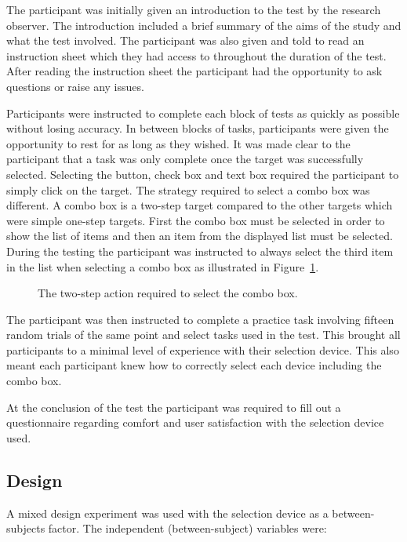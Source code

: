 \documentclass{elsart}
\begin{document}
The participant was initially given an introduction to the test by the
research observer. The introduction included a brief summary of the aims
of the study and what the test involved. The participant was also given
and told to read an instruction sheet which they had access to
throughout the duration of the test. After reading the instruction sheet
the participant had the opportunity to ask questions or raise any
issues.

Participants were instructed to complete each block of tests as quickly
as possible without losing accuracy. In between blocks of tasks,
participants were given the opportunity to rest for as long as they
wished. It was made clear to the participant that a task was only
complete once the target was successfully selected. Selecting the
button, check box and text box required the participant to simply click
on the target. The strategy required to select a combo box was
different. A combo box is a two-step target compared to the other
targets which were simple one-step targets. First the combo box must be
selected in order to show the list of items and then an item from the
displayed list must be selected. During the testing the participant was
instructed to always select the third item in the list when selecting a
combo box as illustrated in Figure~\ref{fig-combo-box}.

\begin{figure}
	\centering
	\caption{The two-step action required to select the combo box.}
	\label{fig-combo-box}
\end{figure}

The participant was then instructed to complete a practice task
involving fifteen random trials of the same point and select tasks used
in the test. This brought all participants to a minimal level of
experience with their selection device. This also meant each participant
knew how to correctly select each device including the combo box.

At the conclusion of the test the participant was required to fill out a
questionnaire regarding comfort and user satisfaction with the selection
device used.

\subsection{Design}
\label{sec-method-design}

A mixed design experiment was used with the selection device as a
between-subjects factor. The independent (between-subject) variables
were:
\end{document}
